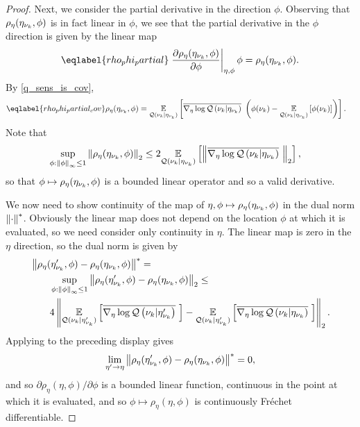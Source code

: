 \begin{proof}
Next, we consider the partial derivative in the direction $\phi$.  Observing
that $\rho_\eta(\eta_{\nu_{k}}, \phi)$ is in fact linear in $\phi$, we see that the
partial derivative in the $\phi$ direction is given by the linear map
%
\begin{align}\eqlabel{rho_phi_partial}
%
\fracat{\partial \rho_\eta(\etanuk, \phi)}
       {\partial \phi}{\eta, \phi} \phi =
    \rho_\eta(\etanuk, \phi).
%
\end{align}
%
By  \eqref{q_sens_is_cov},
%
\begin{align}\eqlabel{rho_phi_partial_cov}
%
\rho_\eta(\etanuk, \phi) ={}&
\expect{\q(\nuk \vert \etanuk)}
       {\lqgradbar{\nuk \vert \etanuk} \left(
        \phi(\nuk) - \expect{\q(\nuk \vert \etanuk)}{\phi(\nuk)}
       \right)
       }.
%
\end{align}
%
Note that
%
\begin{align*}
%
\sup_{\phi: \norminf{\phi} \le 1} \norm{\rho_\eta(\etanuk, \phi)}_2 \le{}&
    2 \expect{\q(\nuk \vert \etanuk)}
             {\norm{\lqgradbar{\nuk \vert \etanuk}}_2
             },
%
\end{align*}
%
so that $\phi \mapsto \rho_\eta(\eta_{\nu_{k}}, \phi)$ is a bounded linear operator and
so a valid derivative.

We now need to show continuity of the map of $\eta, \phi \mapsto
\rho_\eta(\eta_{\nu_{k}}, \phi)$ in the dual norm $\left\Vert\cdot\right\Vert^*$.  Obviously the
linear map does not depend on the location $\phi$ at which it is evaluated, so
we need consider only continuity in $\eta$.  The linear map is zero in the
$\eta$ direction, so the dual norm is given by
%
\begin{align*}
%
\MoveEqLeft
\norm{\rho_\eta(\etanuk', \phi) - \rho_\eta(\etanuk, \phi)}^* ={}\\&
\sup_{\phi: \norminf{\phi} \le 1}
    \norm{\rho_\eta(\etanuk', \phi) - \rho_\eta(\etanuk, \phi)}_2 \le{}\\&
4 \norm{
    \expect{\q(\nuk \vert \etanuk')}{\lqgradbar{\nuk \vert \etanuk'}} -
    \expect{\q(\nuk \vert \etanuk')}{\lqgradbar{\nuk \vert \etanuk}}
}_2.
%
\end{align*}
%
Applying  to the preceding display gives
%
\begin{align*}
%
\lim_{\eta' \rightarrow \eta}
    \norm{\rho_\eta(\etanuk', \phi) - \rho_\eta(\etanuk, \phi)}^* = 0,
%
\end{align*}
%
and so $\partial \rho_\eta(\eta, \phi) / \partial \phi$ is a bounded linear
function, continuous in the point at which it is evaluated, and so $\phi \mapsto
\rho_\eta(\eta, \phi)$ is continuously Fr{\'e}chet differentiable.


\end{proof}

